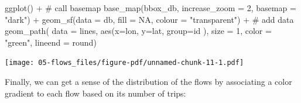 \documentclass[
  letterpaper,
  DIV=11,
  numbers=noendperiod,
  oneside]{scrreprt}
\newenvironment{Shaded}{\begin{snugshade}}{\end{snugshade}}
\newcommand{\AttributeTok}[1]{\textcolor[rgb]{0.40,0.45,0.13}{#1}}
\newcommand{\CommentTok}[1]{\textcolor[rgb]{0.37,0.37,0.37}{#1}}
\newcommand{\ConstantTok}[1]{\textcolor[rgb]{0.56,0.35,0.01}{#1}}
\newcommand{\DecValTok}[1]{\textcolor[rgb]{0.68,0.00,0.00}{#1}}
\newcommand{\FunctionTok}[1]{\textcolor[rgb]{0.28,0.35,0.67}{#1}}
\newcommand{\NormalTok}[1]{\textcolor[rgb]{0.00,0.23,0.31}{#1}}
\newcommand{\SpecialCharTok}[1]{\textcolor[rgb]{0.37,0.37,0.37}{#1}}
\newcommand{\StringTok}[1]{\textcolor[rgb]{0.13,0.47,0.30}{#1}}
\begin{document}
\begin{Shaded}
\begin{Highlighting}[]
\FunctionTok{ggplot}\NormalTok{() }\SpecialCharTok{+}
  \CommentTok{\# call basemap}
  \FunctionTok{base\_map}\NormalTok{(bbox\_db, }\AttributeTok{increase\_zoom =} \DecValTok{2}\NormalTok{, }\AttributeTok{basemap =} \StringTok{"dark"}\NormalTok{) }\SpecialCharTok{+}
  \FunctionTok{geom\_sf}\NormalTok{(}\AttributeTok{data =}\NormalTok{ db, }\AttributeTok{fill =} \ConstantTok{NA}\NormalTok{, }\AttributeTok{colour =} \StringTok{"transparent"}\NormalTok{) }\SpecialCharTok{+}
  \CommentTok{\# add data}
  \FunctionTok{geom\_path}\NormalTok{( }\AttributeTok{data =}\NormalTok{ lines, }
             \FunctionTok{aes}\NormalTok{(}\AttributeTok{x=}\NormalTok{lon, }\AttributeTok{y=}\NormalTok{lat, }
                 \AttributeTok{group=}\NormalTok{id}
\NormalTok{                 ), }
             \AttributeTok{size =} \DecValTok{1}\NormalTok{,}
             \AttributeTok{color =} \StringTok{"green"}\NormalTok{,}
             \AttributeTok{lineend =} \StringTok{\textquotesingle{}round\textquotesingle{}}\NormalTok{)}
\end{Highlighting}
\end{Shaded}

\texttt{[image: 05-flows\_files/figure-pdf/unnamed-chunk-11-1.pdf]}

Finally, we can get a sense of the distribution of the flows by
associating a color gradient to each flow based on its number of trips:
\end{document}
